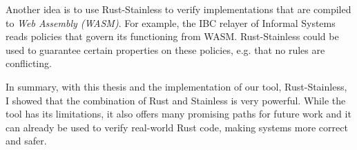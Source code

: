 Another idea is to use Rust-Stainless to verify implementations that are
compiled to \emph{Web Assembly (WASM)}. For example, the IBC relayer of Informal
Systems reads policies that govern its functioning from WASM. Rust-Stainless
could  be used to guarantee certain properties on these policies, e.g. that no
rules are conflicting.


\hfill \break \noindent  In summary, with this thesis and the implementation of
our tool, Rust-Stainless, I showed that the combination of Rust and Stainless is
very powerful. While the tool has its limitations, it also offers many promising
paths for future work and  it can already be used to verify real-world Rust
code, making systems more correct and safer.
